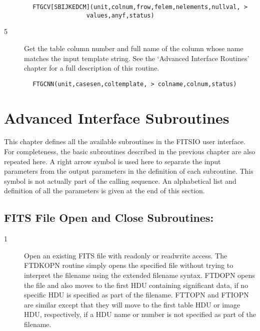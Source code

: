 \documentclass[11pt]{book}
\begin{document}
\begin{verbatim}
        FTGCV[SBIJKEDCM](unit,colnum,frow,felem,nelements,nullval, >
                       values,anyf,status)
\end{verbatim}

\begin{description}
\item[5 ] Get the table column number and full name of the column whose name
    matches the input template string.  See the `Advanced Interface Routines'
   chapter for a full description of this routine.
\end{description}

\begin{verbatim}
        FTGCNN(unit,casesen,coltemplate, > colname,colnum,status)
\end{verbatim}


\chapter{   Advanced Interface Subroutines }

This chapter defines all the available subroutines in the FITSIO user
interface. For completeness, the basic subroutines described in the
previous chapter are also repeated here. A right arrow symbol is used
here to separate the input parameters from the output parameters in the
definition of each subroutine. This symbol is not actually part of the
calling sequence. An alphabetical list and definition of all the
parameters is given at the end of this section.


\section{FITS File Open and Close Subroutines: \label{FTOPEN}}


\begin{description}
\item[1 ]Open an existing FITS file with readonly or readwrite access. The
FTDKOPN routine simply opens the specified file without trying to
interpret the filename using the extended filename syntax. FTDOPN opens
the file and
also moves to the first HDU containing significant data, if no specific
HDU is specified as part of the filename.  FTTOPN and FTIOPN are similar
except that they will move to the first table HDU or image HDU, respectively,
if a HDU name or number is not specified as part of the filename.
\end{description}
\end{document}
